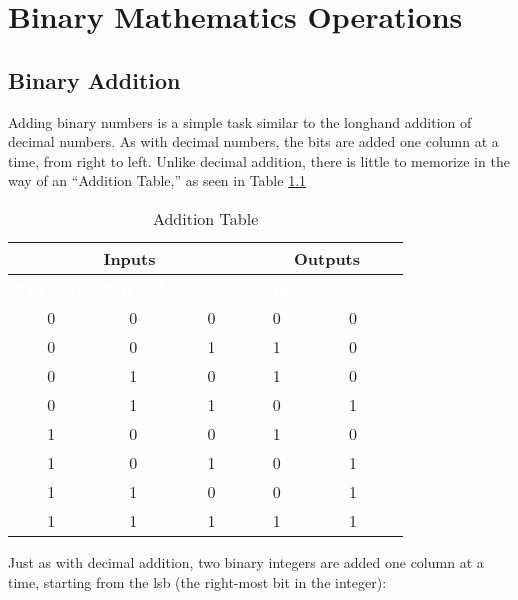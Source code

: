 \chapter{Binary Mathematics Operations}\label{ch03}
\section{Binary Addition}

Adding binary numbers is a simple task similar to the longhand addition of decimal numbers. As with decimal numbers, the bits are added one column at a time, from right to left. Unlike decimal addition, there is little to memorize in the way of an ``Addition Table,'' as seen in Table \ref{MO:tab:binary_addition_table}

\begin{table}[H]
  \sffamily
  \newcommand{\head}[1]{\textcolor{white}{\textbf{#1}}}    
  \begin{center}
    \begin{tabular}{ c c c | c c } \hline
      \multicolumn{3}{c|}{\textbf{Inputs}} & \multicolumn{2}{c}{\textbf{Outputs}} \\
      \hline
      \rowcolor{black!75}
      \head{Carry In} & \head{Augend} & \head{Addend} & \head{Sum} & \head{Carry Out} \\
      \hline
      0        & 0      & 0      & 0   & 0 \\
      0        & 0      & 1      & 1   & 0 \\
      0        & 1      & 0      & 1   & 0 \\
      0        & 1      & 1      & 0   & 1 \\
      1        & 0      & 0      & 1   & 0 \\
      1        & 0      & 1      & 0   & 1 \\
      1        & 1      & 0      & 0   & 1 \\
      1        & 1      & 1      & 1   & 1 \\ \hline
    \end{tabular}
  \end{center}
  \caption{Addition Table}
  \label{MO:tab:binary_addition_table}
\end{table} 

Just as with decimal addition, two binary integers are added one column at a time, starting from the \gls{lsb} (the right-most bit in the integer): 

